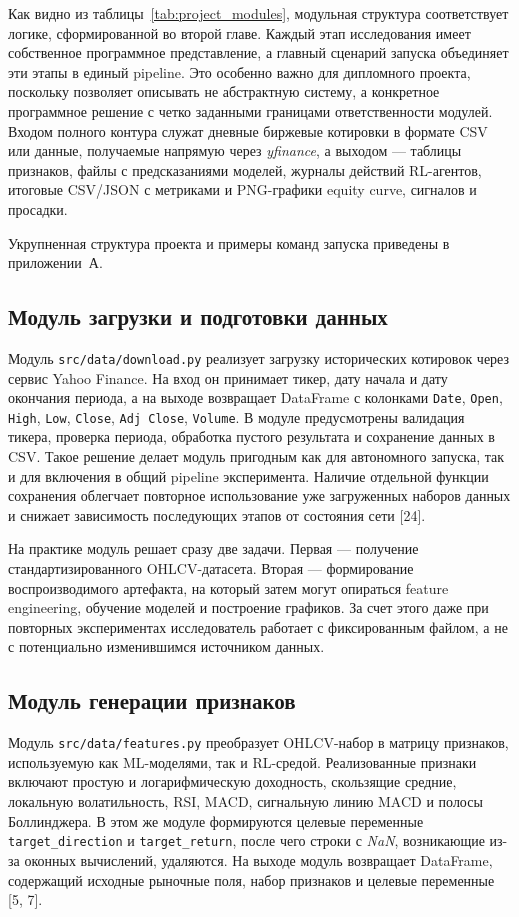 Как видно из таблицы~\ref{tab:project_modules}, модульная структура соответствует логике, сформированной во второй главе. Каждый этап исследования имеет собственное программное представление, а главный сценарий запуска объединяет эти этапы в единый pipeline. Это особенно важно для дипломного проекта, поскольку позволяет описывать не абстрактную систему, а конкретное программное решение с четко заданными границами ответственности модулей. Входом полного контура служат дневные биржевые котировки в формате CSV или данные, получаемые напрямую через \textit{yfinance}, а выходом --- таблицы признаков, файлы с предсказаниями моделей, журналы действий RL-агентов, итоговые CSV/JSON с метриками и PNG-графики equity curve, сигналов и просадки.

Укрупненная структура проекта и примеры команд запуска приведены в приложении~А.

\subsection{Модуль загрузки и подготовки данных}

Модуль \texttt{src/data/download.py} реализует загрузку исторических котировок через сервис Yahoo Finance. На вход он принимает тикер, дату начала и дату окончания периода, а на выходе возвращает DataFrame с колонками \texttt{Date}, \texttt{Open}, \texttt{High}, \texttt{Low}, \texttt{Close}, \texttt{Adj Close}, \texttt{Volume}. В модуле предусмотрены валидация тикера, проверка периода, обработка пустого результата и сохранение данных в CSV. Такое решение делает модуль пригодным как для автономного запуска, так и для включения в общий pipeline эксперимента. Наличие отдельной функции сохранения облегчает повторное использование уже загруженных наборов данных и снижает зависимость последующих этапов от состояния сети [24].

На практике модуль решает сразу две задачи. Первая — получение стандартизированного OHLCV-датасета. Вторая — формирование воспроизводимого артефакта, на который затем могут опираться feature engineering, обучение моделей и построение графиков. За счет этого даже при повторных экспериментах исследователь работает с фиксированным файлом, а не с потенциально изменившимся источником данных.

\subsection{Модуль генерации признаков}

Модуль \texttt{src/data/features.py} преобразует OHLCV-набор в матрицу признаков, используемую как ML-моделями, так и RL-средой. Реализованные признаки включают простую и логарифмическую доходность, скользящие средние, локальную волатильность, RSI, MACD, сигнальную линию MACD и полосы Боллинджера. В этом же модуле формируются целевые переменные \texttt{target\_direction} и \texttt{target\_return}, после чего строки с \textit{NaN}, возникающие из-за оконных вычислений, удаляются. На выходе модуль возвращает DataFrame, содержащий исходные рыночные поля, набор признаков и целевые переменные [5, 7].

